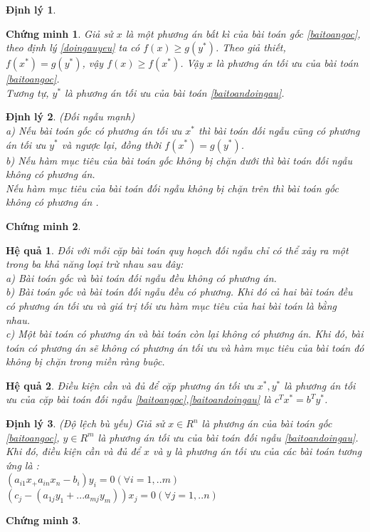 \documentclass[12pt,a4paper]{report}
\newtheorem{dl}{Định lý}
\newtheorem{hq}{Hệ quả}
\newtheorem{cm}{Chứng minh}
\begin{document}
\begin{itemize}
\begin{dl}
    \end{dl}
    \begin{cm}
        Giả sử $x$  là một phương án bất kì của bài toán gốc \eqref{baitoangoc}, theo định lý \eqref{doingauyeu} ta có $f(x)\ge g(y^*)$. Theo giả thiết, $f(x^*)=g(y^*)$, vậy $f(x)\ge f(x^*)$. Vậy $x$ là phương án tối ưu của bài toán \eqref{baitoangoc}.\\
        Tương tự, $y^*$ là phương án tối ưu của bài toán \eqref{baitoandoingau}.
    \end{cm}
\begin{dl}
        (Đối ngẫu mạnh) \\
      a) Nếu bài toán gốc có phương án tối ưu $x^*$ thì bài toán đối ngẫu cũng có phương án tối ưu $y^*$ và ngược lại, đồng thời $f(x^*)=g(y^*)$.\\
      b) Nếu hàm mục tiêu của bài toán gốc không bị chặn dưới thì bài toán đối ngẫu không có phương án.\\
        Nếu hàm mục tiêu của bài toán đối ngẫu không bị chặn trên thì bài toán gốc không có phương án .
    \end{dl}
\begin{cm}
    
\end{cm}
\begin{hq}
        Đối với mỗi cặp bài toán quy hoạch đối ngẫu chỉ có thể xảy ra một trong ba khả năng loại trừ nhau sau đây:\\
        a) Bài toán gốc và bài toán đối ngẫu đều không có phương án.\\
        b) Bài toán gốc và bài toán đối ngẫu đều có phương. Khi đó cả hai bài toán đều có phương án tối ưu và giá trị tối ưu hàm mục tiêu của hai bài toán là bằng nhau.\\
        c) Một bài toán có phương án và bài toán còn lại không có phương án. Khi đó, bài toán có phương án sẽ không có phương án tối ưu và hàm mục tiêu của bài toán đó không bị chặn trong miền ràng buộc.
    \end{hq}
    \begin{hq}
        Điều kiện cần và đủ để cặp phương án tối ưu $x^*,y^*$ là phương án tối ưu của cặp bài toán đối ngẫu \eqref{baitoangoc},\eqref{baitoandoingau} là $c^Tx^*=b^Ty^*$.
    \end{hq}
    \begin{dl}\label{dl1.4}
        (Độ lệch bù yếu) Giả sử $x \in R^n$ là phương án của bài toán gốc \eqref{baitoangoc}, $y\in R^m$ là phương án tối ưu của bài toán đối ngẫu \eqref{baitoandoingau}. Khi đó, điều kiện cần và đủ để $x$ và $y$ là phương án tối ưu của các bài toán tương ứng là :\\
        $(a_{i1}x_ +a_{in}x_n -b_i)y_i=0 (\forall {i=1,..m})\label{1.4.1}$\\
        $(c_j-(a_{1j} y_1+...a_{mj}y_m))x_j=0 (\forall{j=1,..n})  $\label{1.4.2}\\   
    \end{dl}
    \begin{cm}
        

\end{cm}
\end{itemize}
\end{document}
